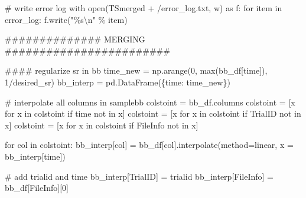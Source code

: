 \documentclass[
  letterpaper,
  DIV=11,
  numbers=noendperiod]{scrreprt}
\newenvironment{Shaded}{\begin{snugshade}}{\end{snugshade}}
\newcommand{\BuiltInTok}[1]{\textcolor[rgb]{0.00,0.23,0.31}{#1}}
\newcommand{\CharTok}[1]{\textcolor[rgb]{0.13,0.47,0.30}{#1}}
\newcommand{\CommentTok}[1]{\textcolor[rgb]{0.37,0.37,0.37}{#1}}
\newcommand{\ControlFlowTok}[1]{\textcolor[rgb]{0.00,0.23,0.31}{#1}}
\newcommand{\DecValTok}[1]{\textcolor[rgb]{0.68,0.00,0.00}{#1}}
\newcommand{\ImportTok}[1]{\textcolor[rgb]{0.00,0.46,0.62}{#1}}
\newcommand{\KeywordTok}[1]{\textcolor[rgb]{0.00,0.23,0.31}{#1}}
\newcommand{\NormalTok}[1]{\textcolor[rgb]{0.00,0.23,0.31}{#1}}
\newcommand{\OperatorTok}[1]{\textcolor[rgb]{0.37,0.37,0.37}{#1}}
\newcommand{\SpecialCharTok}[1]{\textcolor[rgb]{0.37,0.37,0.37}{#1}}
\newcommand{\StringTok}[1]{\textcolor[rgb]{0.13,0.47,0.30}{#1}}
\begin{document}
\begin{Shaded}
\begin{Highlighting}[]
    \CommentTok{\# write error log}
    \ControlFlowTok{with} \BuiltInTok{open}\NormalTok{(TSmerged }\OperatorTok{+} \StringTok{\textquotesingle{}/error\_log.txt\textquotesingle{}}\NormalTok{, }\StringTok{\textquotesingle{}w\textquotesingle{}}\NormalTok{) }\ImportTok{as}\NormalTok{ f:}
        \ControlFlowTok{for}\NormalTok{ item }\KeywordTok{in}\NormalTok{ error\_log:}
\NormalTok{            f.write(}\StringTok{"}\SpecialCharTok{\%s}\CharTok{\textbackslash{}n}\StringTok{"} \OperatorTok{\%}\NormalTok{ item)}


    \CommentTok{\#\#\#\#\#\#\#\#\#\#\#\#\#\# MERGING \#\#\#\#\#\#\#\#\#\#\#\#\#\#\#\#\#\#\#\#\#\#\#\#}

    \CommentTok{\#\#\#\# regularize sr in bb}
\NormalTok{    time\_new }\OperatorTok{=}\NormalTok{ np.arange(}\DecValTok{0}\NormalTok{, }\BuiltInTok{max}\NormalTok{(bb\_df[}\StringTok{\textquotesingle{}time\textquotesingle{}}\NormalTok{]), }\DecValTok{1}\OperatorTok{/}\NormalTok{desired\_sr)}
\NormalTok{    bb\_interp }\OperatorTok{=}\NormalTok{ pd.DataFrame(\{}\StringTok{\textquotesingle{}time\textquotesingle{}}\NormalTok{: time\_new\})}
    
    \CommentTok{\# interpolate all columns in samplebb }
\NormalTok{    colstoint }\OperatorTok{=}\NormalTok{ bb\_df.columns}
\NormalTok{    colstoint }\OperatorTok{=}\NormalTok{ [x }\ControlFlowTok{for}\NormalTok{ x }\KeywordTok{in}\NormalTok{ colstoint }\ControlFlowTok{if} \StringTok{\textquotesingle{}time\textquotesingle{}} \KeywordTok{not} \KeywordTok{in}\NormalTok{ x]}
\NormalTok{    colstoint }\OperatorTok{=}\NormalTok{ [x }\ControlFlowTok{for}\NormalTok{ x }\KeywordTok{in}\NormalTok{ colstoint }\ControlFlowTok{if} \StringTok{\textquotesingle{}TrialID\textquotesingle{}} \KeywordTok{not} \KeywordTok{in}\NormalTok{ x]}
\NormalTok{    colstoint }\OperatorTok{=}\NormalTok{ [x }\ControlFlowTok{for}\NormalTok{ x }\KeywordTok{in}\NormalTok{ colstoint }\ControlFlowTok{if} \StringTok{\textquotesingle{}FileInfo\textquotesingle{}} \KeywordTok{not} \KeywordTok{in}\NormalTok{ x]}

    \ControlFlowTok{for}\NormalTok{ col }\KeywordTok{in}\NormalTok{ colstoint:}
\NormalTok{        bb\_interp[col] }\OperatorTok{=}\NormalTok{ bb\_df[col].interpolate(method}\OperatorTok{=}\StringTok{\textquotesingle{}linear\textquotesingle{}}\NormalTok{, x }\OperatorTok{=}\NormalTok{ bb\_interp[}\StringTok{\textquotesingle{}time\textquotesingle{}}\NormalTok{])}

    \CommentTok{\# add trialid and time}
\NormalTok{    bb\_interp[}\StringTok{\textquotesingle{}TrialID\textquotesingle{}}\NormalTok{] }\OperatorTok{=}\NormalTok{ trialid}
\NormalTok{    bb\_interp[}\StringTok{\textquotesingle{}FileInfo\textquotesingle{}}\NormalTok{] }\OperatorTok{=}\NormalTok{ bb\_df[}\StringTok{\textquotesingle{}FileInfo\textquotesingle{}}\NormalTok{][}\DecValTok{0}\NormalTok{]}
    

\end{Highlighting}
\end{Shaded}
\end{document}

